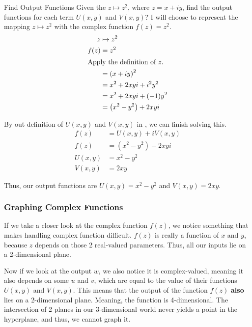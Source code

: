 \begin{example}[Lecture 4]{Find Output Functions}
  Given the  $z \mapsto z^{2}$, where $z = x + iy$, find the output functions for each term $U(x, y)$ and $V(x, y)$?
  \tcblower{}
  I will choose to represent the mapping $z \mapsto z^{2}$ with the complex function $f(z) = z^{2}$.
  \begin{align*}
    z &\mapsto z^{2} \\
    f(z) &= z^{2} \\
    \shortintertext{Apply the definition of $z$.}
      &= {(x + iy)}^{2} \\
      &= x^{2} + 2xyi + i^{2}y^{2} \\
      &= x^{2} + 2xyi + (-1)y^{2} \\
      &= \left( x^{2} - y^{2} \right) + 2xyi \\
  \end{align*}

  By out definition of $U(x, y)$ and $V(x, y)$ in , we can finish solving this.
  \begin{align*}
    f(z) &= U(x, y) + iV(x, y) \\
    f(z) &= \left( x^{2} - y^{2} \right) + 2xyi \\
    U(x, y) &= x^{2} - y^{2} \\
    V(x, y) &= 2xy
  \end{align*}

  Thus, our output functions are $U(x, y) = x^{2} - y^{2}$ and $V(x, y) = 2xy$.
\end{example}

\subsubsection{Graphing Complex Functions}\label{subsubsec:Graphing_Complex_Functions}
If we take a closer look at the complex function $f(z)$, we notice something that makes handling complex function difficult.
$f(z)$ is really a function of $x$ and $y$, because $z$ depends on those 2 real-valued parameters.
Thus, all our inputs lie on a 2-dimensional plane.

Now if we look at the output $w$, we also notice it is complex-valued, meaning it also depends on some $u$ and $v$, which are equal to the value of their functions $U(x, y)$ and $V(x, y)$.
This means that the output of the function $f(z)$ \textbf{also} lies on a 2-dimensional plane.
Meaning, the function is 4-dimensional.
The intersection of 2 planes in our 3-dimensional world never yields a point in the hyperplane, and thus, we cannot graph it.

